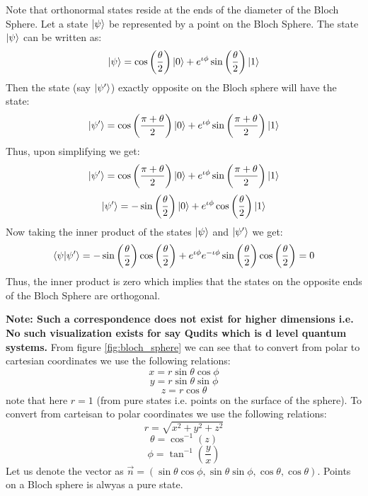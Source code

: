 Note that orthonormal states reside at the ends of the diameter of the Bloch Sphere. 
Let a state $\ket{\psi}$ be represented by a point on the Bloch Sphere. The state $\ket{\psi}$ can be written as:
\[
    \ket{\psi}=\cos\left(\frac{\theta}{2}\right)\ket{0}+e^{\iota \phi}\sin\left(\frac{\theta}{2}\right)\ket{1}
\]
Then the state (say $\ket{\psi'}$) exactly opposite on the Bloch sphere will have the state:
\[
    \ket{\psi'}=\cos\left(\frac{\pi+\theta}{2}\right)\ket{0}+e^{\iota \phi}\sin\left(\frac{\pi+\theta}{2}\right)\ket{1}
\]
Thus, upon simplifying we get:
\[
    \ket{\psi'}=\cos\left(\frac{\pi+\theta}{2}\right)\ket{0}+e^{\iota \phi}\sin\left(\frac{\pi+\theta}{2}\right)\ket{1}
\]
\[
    \ket{\psi'}=-\sin \left(\frac{\theta}{2}\right)\ket{0}+e^{\iota \phi}\cos\left(\frac{\theta}{2}\right)\ket{1}
\]
Now taking the inner product of the states $\ket{\psi}$ and $\ket{\psi'}$ we get:
\[
    \braket{\psi|\psi'}=-\sin\left(\frac{\theta}{2}\right)\cos\left(\frac{\theta}{2}\right)+e^{\iota \phi}e^{-\iota \phi}\sin\left(\frac{\theta}{2}\right)\cos\left(\frac{\theta}{2}\right)=0
\]
Thus, the inner product is zero which implies that the states on the opposite ends of the Bloch Sphere are orthogonal.

\textbf{Note: Such a correspondence does not exist for higher dimensions i.e. No such visualization exists for say Qudits which is d level quantum systems.}
From figure \ref{fig:bloch_sphere} we can see that to convert from polar to cartesian coordinates we use the following relations:
\[
    x=r\sin\theta\cos\phi
\]
\[
    y=r\sin\theta\sin\phi
\]
\[
    z=r\cos\theta
\]
note that here $r=1$ (from pure states i.e. points on the surface of the sphere). To convert from carteisan to polar coordinates we use the following relations:
\[
    r=\sqrt{x^2+y^2+z^2}
\]
\[
    \theta=\cos^{-1}(z)
\]
\[
    \phi=\tan^{-1}\left(\frac{y}{x}\right)
\]
Let us denote the vector as $\vec{n}=(\sin\theta \cos \phi, \sin \theta \sin \phi, \cos \theta, \cos \theta)$.
Points on a Bloch sphere is alwyas a pure state.


